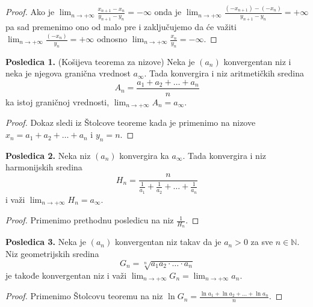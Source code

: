 \documentclass[a4paper,12pt]{article}
\theoremstyle{plain}
\theoremstyle{definition}
\theoremstyle{remark}
\begin{document}
\begin{proof}
Ako je $\lim_{n \to +\infty} \frac{x_{n+1}-x_n}{y_{n+1}-y_n} = -\infty$ onda je $\lim_{n \to +\infty} \frac{(-x_{n+1})-(-x_n)}{y_{n+1}-y_n} = +\infty$ pa sad premenimo ono od malo pre i zaključujemo da će važiti $\lim_{n \to +\infty} \frac{(-x_n)}{y_n} = +\infty$ odnosno $\lim_{n \to +\infty} \frac{x_n}{y_n} = -\infty$.
\end{proof}
\textbf{Posledica 1.} (Košijeva teorema za nizove) Neka je $(a_n)$ konvergentan niz i neka je njegova granična vrednost $a_{\infty}$. Tada konvergira i niz aritmetičkih sredina
$$ A_n = \frac{a_1 + a_2 + \ldots + a_n}{n} $$
ka istoj graničnoj vrednosti, $\lim_{n \to +\infty} A_n = a_{\infty}$.

\begin{proof}
Dokaz sledi iz Štolcove teoreme kada je primenimo na nizove $x_n = a_1 + a_2 + \ldots + a_n$ i $y_n = n$.
\end{proof}

\textbf{Posledica 2.} Neka niz $(a_n)$ konvergira ka $a_{\infty}$. Tada konvergira i niz harmonijskih sredina
$$ H_n = \frac{n}{\frac{1}{a_1} + \frac{1}{a_2} + \ldots + \frac{1}{a_n}} $$
i važi $\lim_{n \to +\infty} H_n = a_{\infty}$.

\begin{proof}
Primenimo prethodnu posledicu na niz $\frac{1}{H_n}$.
\end{proof}

\textbf{Posledica 3.} Neka je $(a_n)$ konvergentan niz takav da je $a_n > 0$ za sve $n \in \mathbb{N}$. Niz geometrijskih sredina
$$ G_n = \sqrt[n]{a_1 a_2 \cdot \ldots \cdot a_n} $$
je takođe konvergentan niz i važi $\lim_{n \to +\infty} G_n = \lim_{n \to +\infty} a_n$.

\begin{proof}
Primenimo Štolcovu teoremu na niz $\ln G_n = \frac{\ln a_1 + \ln a_2 + \ldots + \ln a_n}{n}$.
\end{proof}
\end{document}
